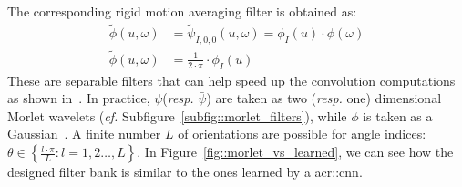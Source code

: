                     The corresponding rigid motion averaging filter is obtained as:
                    \begin{align}
                        \label{eq::roto-translation_low_pass}
                        \tilde{\phi}(u, \omega) &= \tilde{\psi}_{I, 0, 0}(u, \omega) = \phi_I(u) \cdot \bar\phi(\omega) \nonumber \\
                        \tilde{\phi}(u, \omega) &= \frac{1}{2\cdot\pi} \cdot \phi_I(u)
                    \end{align}
                    These are separable filters that can help speed up the convolution computations as shown in~\textcite{sifre2013rotation}.
                    In practice, $\psi$(\textit{resp.} $\bar\psi$) are taken as two (\textit{resp.} one) dimensional Morlet wavelets (\textit{cf.} Subfigure~\ref{subfig::morlet_filters}), while $\phi$ is taken as a Gaussian~\parencite{sifre2013rotation,bruna2013invariant,oyallon2015deep}.
                    A finite number $L$ of orientations are possible for angle indices: $\theta \in \left\{\frac{l\cdot\pi}{L}: l=1,2\dots,L\right\}$.
                    In Figure~\ref{fig::morlet_vs_learned}, we can see how the designed filter bank is similar to the ones learned by a \gls{acr::cnn}.
